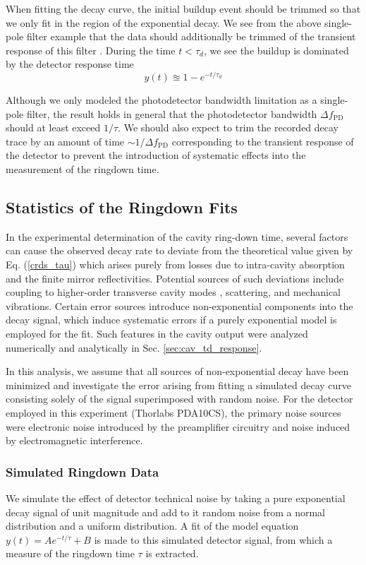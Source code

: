 \documentclass[8pt,a4paper]{report}
\begin{document}
	When fitting the decay curve, the initial buildup event should be trimmed so that we only fit in the region of the exponential decay. We see from the above single-pole filter example that the data should additionally be trimmed of the transient response of this filter \cite{frontiers_mol_spec}. During the time $t<\tau_d$, we see the buildup is dominated by the detector response time
	\begin{equation}
		y(t) \approxeq 1- e^{-t/\tau_d}
	\end{equation}
	
	Although we only modeled the photodetector bandwidth limitation as a single-pole filter, the result holds in general that the photodetector bandwidth $\Delta f_\mathrm{PD}$ should at least exceed $1/\tau$. We should also expect to trim the recorded decay trace by an amount of time $\sim 1/\Delta f_\mathrm{PD}$ corresponding to the transient response of the detector to prevent the introduction of systematic effects into the measurement of the ringdown time.
	
	\subsection{Statistics of the Ringdown Fits}
	In the experimental determination of the cavity ring-down time, several factors can cause the observed decay rate to deviate from the theoretical value given by Eq. (\ref{crds_tau}) which arises purely from losses due to intra-cavity absorption and the finite mirror reflectivities. Potential sources of such deviations include coupling to higher-order transverse cavity modes \cite{crds_noise_higherOrderModes}, scattering, and mechanical vibrations. Certain error sources introduce non-exponential components into the decay signal, which induce systematic errors if a purely exponential model is employed for the fit. Such features in the cavity output were analyzed numerically and analytically in Sec. \ref{sec:cav_td_response}.
	
	In this analysis, we assume that all sources of non-exponential decay have been minimized and investigate the error arising from fitting a simulated decay curve consisting solely of the signal superimposed with random noise. For the detector employed in this experiment (Thorlabs PDA10CS), the primary noise sources were electronic noise introduced by the preamplifier circuitry and noise induced by electromagnetic interference.
	
	\subsubsection{Simulated Ringdown Data}	
	We simulate the effect of detector technical noise by taking a pure exponential decay signal of unit magnitude and add to it random noise from a normal distribution and a uniform distribution. A fit of the model equation $y(t) = Ae^{-t/\tau} + B$ is made to this simulated detector signal, from which a measure of the ringdown time $\tau$ is extracted.
	
\end{document}
